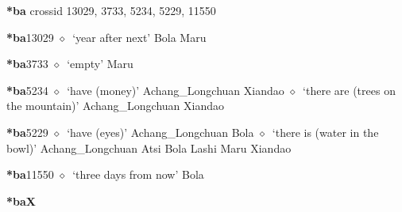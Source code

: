 \item
\textbf{*ba}
  {\tiny crossid 13029, 3733, 5234, 5229, 11550}
  \begin{list}{}{\leftmargin=1.5em \itemindent=-1.5em}
  \item {\footnotesize \textbf{*ba}}{\tiny 13029}
         $\diamond$~`year after next'
         Bola 
\hspace{1ex}
         Maru 
  \item {\footnotesize \textbf{*ba}}{\tiny 3733}
\hspace{1ex}
         $\diamond$~`empty'
         Maru 
  \item {\footnotesize \textbf{*ba}}{\tiny 5234}
\hspace{1ex}
         $\diamond$~`have (money)'
         Achang\_Longchuan 
\hspace{1ex}
         Xiandao 
\hspace{1ex}
         $\diamond$~`there are (trees on the mountain)'
         Achang\_Longchuan 
\hspace{1ex}
         Xiandao 
  \item {\footnotesize \textbf{*ba}}{\tiny 5229}
\hspace{1ex}
         $\diamond$~`have (eyes)'
         Achang\_Longchuan 
\hspace{1ex}
         Bola 
\hspace{1ex}
         $\diamond$~`there is (water in the bowl)'
         Achang\_Longchuan 
\hspace{1ex}
         Atsi 
\hspace{1ex}
         Bola 
\hspace{1ex}
         Lashi 
\hspace{1ex}
         Maru 
\hspace{1ex}
         Xiandao 
  \item {\footnotesize \textbf{*ba}}{\tiny 11550}
\hspace{1ex}
         $\diamond$~`three days from now'
         Bola 
  \end{list}
\item
\textbf{*baX}
